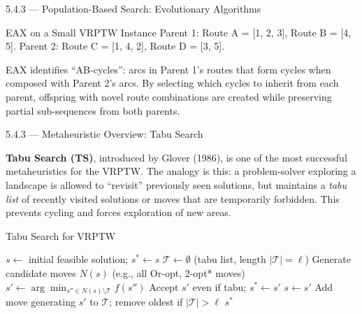 \documentclass[aspectratio=169,10pt]{beamer}
\begin{document}
\begin{frame}[allowframebreaks]{5.4.3 --- Population-Based Search: Evolutionary Algorithms}
\begin{exampleblock}{EAX on a Small VRPTW Instance}
Parent 1: Route A = [1, 2, 3], Route B = [4, 5].
Parent 2: Route C = [1, 4, 2], Route D = [3, 5].

\medskip
EAX identifies ``AB-cycles'': arcs in Parent 1's routes that form cycles when
composed with Parent 2's arcs.  By selecting which cycles to inherit from each
parent, offspring with novel route combinations are created while preserving
partial sub-sequences from both parents.
\end{exampleblock}

\end{frame}

\begin{frame}[allowframebreaks]{5.4.3 --- Metaheuristic Overview: Tabu Search}

\textbf{Tabu Search (TS)}, introduced by Glover (1986), is one of the most
successful metaheuristics for the VRPTW.  The analogy is this: a problem-solver
exploring a landscape is allowed to ``revisit'' previously seen solutions, but
maintains a \emph{tabu list} of recently visited solutions or moves that are
temporarily forbidden.  This prevents cycling and forces exploration of new areas.

\begin{block}{Tabu Search for VRPTW}
\begin{algorithmic}[1]
\State $s \leftarrow$ initial feasible solution; $s^* \leftarrow s$
\State $\mathcal{T} \leftarrow \emptyset$ (tabu list, length $|\mathcal{T}| = \ell$)
\Repeat
  \State Generate candidate moves $N(s)$ (e.g., all Or-opt, 2-opt* moves)
  \State $s' \leftarrow \arg\min_{s'' \in N(s) \setminus \mathcal{T}} f(s'')$
    \State Accept $s'$ even if tabu; $s^* \leftarrow s'$
  \EndIf
  \State $s \leftarrow s'$
  \State Add move generating $s'$ to $\mathcal{T}$; remove oldest if $|\mathcal{T}| > \ell$
\State \Return $s^*$
\end{algorithmic}
\end{block}

\framebreak


\end{frame}
\end{document}
